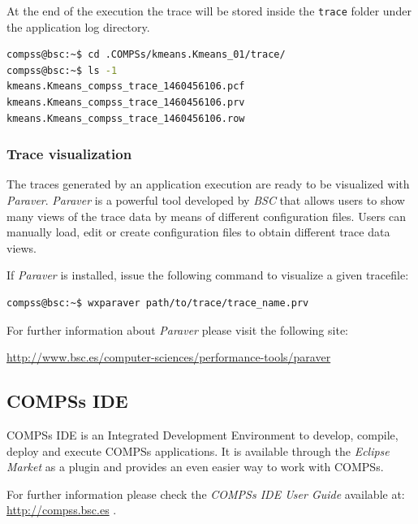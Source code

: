At the end of the execution the trace will be stored inside the \texttt{trace} folder under the application log directory.
\begin{lstlisting}[language=bash]
compss@bsc:~$ cd .COMPSs/kmeans.Kmeans_01/trace/
compss@bsc:~$ ls -1
kmeans.Kmeans_compss_trace_1460456106.pcf
kmeans.Kmeans_compss_trace_1460456106.prv
kmeans.Kmeans_compss_trace_1460456106.row
\end{lstlisting}


\subsubsection{Trace visualization}
The traces generated by an application execution are ready to be visualized with \textit{Paraver}. \textit{Paraver} is a powerful 
tool developed by \textit{BSC} that allows users to show many views of the trace data by means of different configuration files.
Users can manually load, edit or create configuration files to obtain different trace data views.

If \textit{Paraver} is installed, issue the following command to visualize a given tracefile:

\begin{lstlisting}[language=bash]
compss@bsc:~$ wxparaver path/to/trace/trace_name.prv
\end{lstlisting}

For further information about \textit{Paraver} please visit the following site:
\begin{center}
\url{http://www.bsc.es/computer-sciences/performance-tools/paraver}
\end{center}

\newpage

\subsection{COMPSs IDE}
\label{subsec:IDE}
COMPSs IDE is an Integrated Development Environment to develop, compile, deploy and execute COMPSs applications. It is available
through the \textit{Eclipse Market} as a plugin and provides an even easier way to work with COMPSs.

For further information please check the \textit{COMPSs IDE User Guide} available at: \url{http://compss.bsc.es} .

